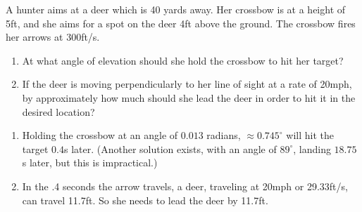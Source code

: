 {A hunter aims at a deer which is 40 yards away. Her crossbow is at a height of 5ft, and she aims for a spot on the deer 4ft above the ground. The crossbow fires her arrows at 300ft/s.
\begin{enumerate}
	\item At what angle of elevation should she hold the crossbow to hit her target?
	\item	If the deer is moving perpendicularly to her line of sight at a rate of 20mph, by approximately how much should she lead the deer in order to hit it in the desired location?
\end{enumerate} 
}
{\begin{enumerate}
	\item Holding the crossbow at an angle of $0.013$ radians, $\approx 0.745^\circ$ will hit the target $0.4$s later. (Another solution exists, with an angle of $89^\circ$, landing $18.75$s later, but this is impractical.)
	\item	In the .4 seconds the arrow travels, a deer, traveling at 20mph or 29.33ft/s, can travel 11.7ft. So she needs to lead the deer by 11.7ft.
\end{enumerate}
}